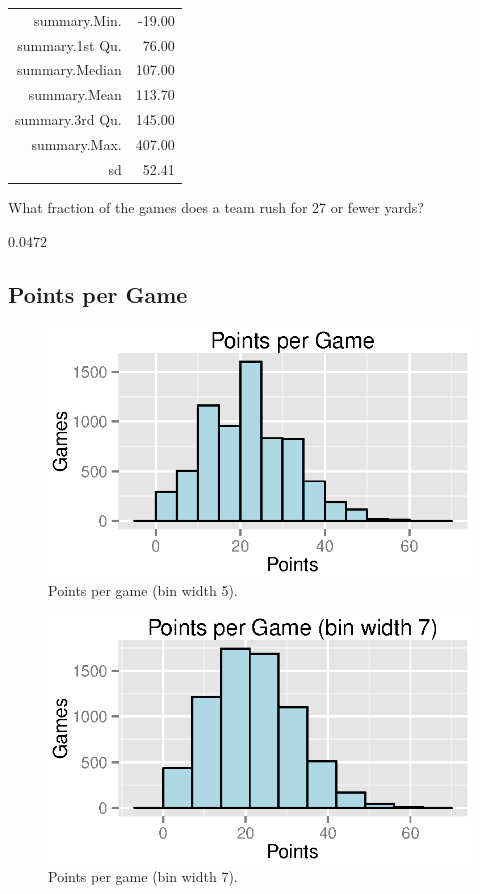 \documentclass{exam}
\begin{document}
  \begin{table}[H]
    \centering
    \begin{tabular}{rr}
      \toprule
      summary.Min.    & -19.00 \\
      summary.1st Qu. & 76.00 \\
      summary.Median  & 107.00 \\
      summary.Mean    & 113.70 \\
      summary.3rd Qu. & 145.00 \\
      summary.Max.    & 407.00 \\
      sd              & 52.41 \\
      \bottomrule
    \end{tabular}
  \end{table}

  What fraction of the games does a team rush for 27 or fewer yards?
  \begin{solution}
    $0.0472$
  \end{solution}

  \subsection{Points per Game}

  \begin{figure}[H]
    \centering
    \includegraphics{figures/nfl/pts_per_game_bw5.eps}
    \caption{Points per game (bin width 5).}
  \end{figure}
  
  \begin{figure}[H]
    \centering
    \includegraphics{figures/nfl/pts_per_game.eps}
    \caption{Points per game (bin width 7).}
  \end{figure}
\end{document}
